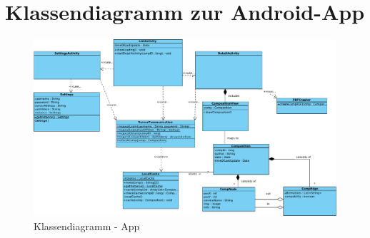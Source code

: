 \section*{Klassendiagramm zur Android-App}

\begin{figure}[h]
	\centering
	\includegraphics[width=\textwidth]{Klassendiagramm_App/Class_Diagram1}
	\caption{Klassendiagramm - App}
	\label{fig:klassendiagramm-a}
\end{figure}

